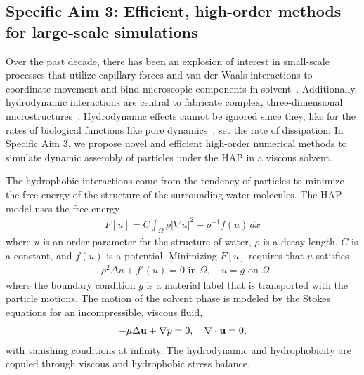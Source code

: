 \subsection{Specific Aim 3: Efficient, high-order methods for
large-scale simulations}
\label{subsec:specific_aim_3}
Over the past decade, there has been an explosion of interest in
small-scale processes that utilize capillary forces and van der Waals
interactions to coordinate movement and bind microscopic components in
solvent~\cite{Pandey2011, Zhang2017, Siontorou2017}. Additionally,
hydrodynamic interactions are central to fabricate complex,
three-dimensional microstructures~\cite{Dasgupta2017, Leong2007,
Reynolds2019, Cho2010}. Hydrodynamic effects cannot be ignored since
they, like for the rates of biological functions like pore
dynamics~\cite{RYHAM20112929}, set the rate of dissipation. In Specific
Aim 3, we propose novel and efficient high-order numerical methods to
simulate dynamic assembly of particles under the HAP in a viscous
solvent.

The hydrophobic interactions come from the tendency of particles to
minimize the free energy of the structure of the surrounding water
molecules. The HAP model uses the free energy
\begin{align}
\label{eq:free_energy}
F[u] = C \int_{\Omega} \rho |\nabla u|^2 + \rho^{-1} f(u) \,dx
\end{align}
where $u$ is an order parameter for the structure of water, $\rho$ is a
decay length, $C$ is a constant, and $f(u)$ is a potential.
Minimizing $F[u]$ requires that $u$ satisfies 
\begin{align}
  \label{eq:SL}
  -\rho^2 \Delta u + f'(u) = 0  \text{ in } \Omega,\quad u = g
  \text{ on } \Omega.
\end{align}
where the boundary condition $g$ is a material label that is transported
with the particle motions. The motion of the solvent phase is modeled by
the Stokes equations for an incompressible, viscous fluid, 
\begin{align}
  -\mu \Delta \mathbf{u} + \nabla p = 0, \quad \nabla \cdot \mathbf{u} = 0,
  \label{eq:stokes}
\end{align}
with vanishing conditions at infinity. The hydrodynamic and
hydrophobicity are copuled through viscous and hydrophobic stress
balance.

